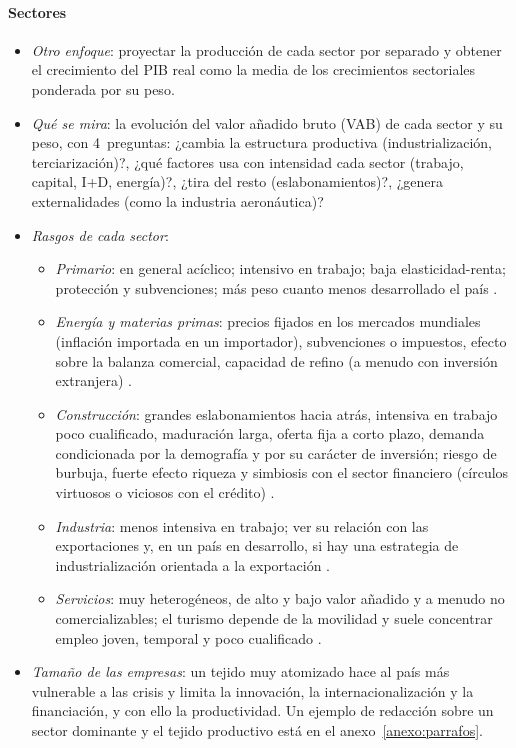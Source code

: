 \documentclass[11pt]{article}
\begin{document}
\paragraph{Sectores}
\begin{itemize}
\item \emph{Otro enfoque}: proyectar la producción de cada sector por separado y obtener el crecimiento del PIB real como la media de los crecimientos sectoriales ponderada por su peso.
\item \emph{Qué se mira}: la evolución del valor añadido bruto (VAB) de cada sector y su peso, con 4~preguntas: ¿cambia la estructura productiva (industrialización, terciarización)?, ¿qué factores usa con intensidad cada sector (trabajo, capital, I+D, energía)?, ¿tira del resto (eslabonamientos)?, ¿genera externalidades (como la industria aeronáutica)?
\item \emph{Rasgos de cada sector}:
  \begin{itemize}
  \item \emph{Primario}: en general acíclico; intensivo en trabajo; baja elasticidad-renta; protección y subvenciones; más peso cuanto menos desarrollado el país .
  \item \emph{Energía y materias primas}: precios fijados en los mercados mundiales (inflación importada en un importador), subvenciones o impuestos, efecto sobre la balanza comercial, capacidad de refino (a menudo con inversión extranjera) .
  \item \emph{Construcción}: grandes eslabonamientos hacia atrás, intensiva en trabajo poco cualificado, maduración larga, oferta fija a corto plazo, demanda condicionada por la demografía y por su carácter de inversión; riesgo de burbuja, fuerte efecto riqueza y simbiosis con el sector financiero (círculos virtuosos o viciosos con el crédito) .
  \item \emph{Industria}: menos intensiva en trabajo; ver su relación con las exportaciones y, en un país en desarrollo, si hay una estrategia de industrialización orientada a la exportación .
  \item \emph{Servicios}: muy heterogéneos, de alto y bajo valor añadido y a menudo no comercializables; el turismo depende de la movilidad y suele concentrar empleo joven, temporal y poco cualificado .
  \end{itemize}
\item \emph{Tamaño de las empresas}: un tejido muy atomizado hace al país más vulnerable a las crisis y limita la innovación, la internacionalización y la financiación, y con ello la productividad. Un ejemplo de redacción sobre un sector dominante y el tejido productivo está en el anexo~\ref{anexo:parrafos}.
\end{itemize}
\end{document}
